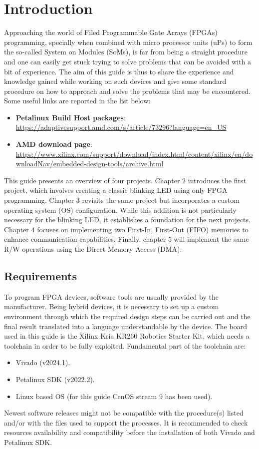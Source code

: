 \chapter{Introduction}
Approaching the world of Filed Programmable Gate Arrays (FPGAs) programming, specially when combined with micro processor units (uPs) to form the so-called System on Modules (SoMs), is far from being a straight procedure and one can easily get stuck trying to solve problems that can be avoided with a bit of experience. The aim of this guide is thus to share the experience and knowledge gained while working on such devices and give some standard procedure on how to approach and solve the problems that may be encountered. Some useful links are reported in the list below:
\begin{itemize}
	\item \textbf{Petalinux Build Host packages}:  \url{https://adaptivesupport.amd.com/s/article/73296?language=en\_US} 
	
	\item \textbf{AMD download page}:  \url{https://www.xilinx.com/support/download/index.html/content/xilinx/en/downloadNav/embedded-design-tools/archive.html}
\end{itemize} 
This guide presents an overview of four projects. Chapter 2 introduces the first project, which involves creating a classic blinking LED using only FPGA programming. Chapter 3 revisits  the same project but incorporates a custom operating system (OS) configuration. While this addition is not particularly necessary for the blinking LED, it establishes a foundation for the next projects. Chapter 4 focuses on implementing two First-In, First-Out (FIFO) memories to enhance communication capabilities. Finally, chapter 5 will implement the same R/W operations using the Direct Memory Access (DMA).  


\section{Requirements}
To program FPGA devices, software tools are usually provided by the manufacturer. Being hybrid devices, it is necessary to set up a custom environment through which the required design steps can be carried out and the final result translated into a language understandable by the device. The board used in this guide is the Xilinx Kria KR260 Robotics Starter Kit, which needs a toolchain in order to be fully exploited. Fundamental part of the toolchain are:
\begin{itemize}
	\item Vivado (v2024.1).
	
	\item Petalinux SDK (v2022.2).
	
	\item Linux based OS (for this guide CenOS stream 9 has been used).
\end{itemize}
Newest software releases might not be compatible with the procedure(s) listed and/or with the files used to support the processes. It is recommended to check resources availability and compatibility before the installation of both Vivado and Petalinux SDK.

